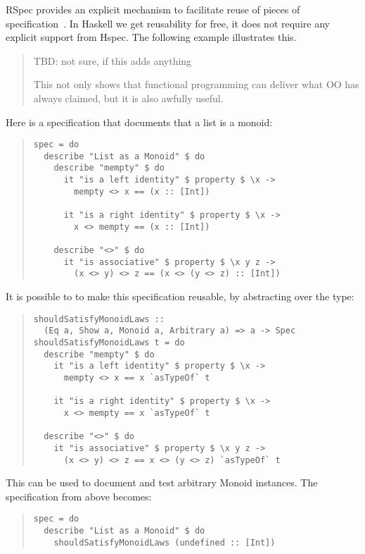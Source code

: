 \documentclass[preprint]{sigplanconf}
\begin{document}
RSpec provides an explicit mechanism to facilitate reuse of pieces of
specification~\cite{rspec}.
In Haskell we get reusability for free, it does not require any
explicit support from Hspec.
The following example illustrates this.

\begin{quote}
  TBD: not sure, if this adds anything

This not only shows that functional programming can deliver what OO
has always claimed, but it is also awfully useful.
\end{quote}
Here is a specification that documents that a list is a monoid:

\begin{quote}
\small
\begin{verbatim}
spec = do
  describe "List as a Monoid" $ do
    describe "mempty" $ do
      it "is a left identity" $ property $ \x ->
        mempty <> x == (x :: [Int])

      it "is a right identity" $ property $ \x ->
        x <> mempty == (x :: [Int])

    describe "<>" $ do
      it "is associative" $ property $ \x y z ->
        (x <> y) <> z == (x <> (y <> z) :: [Int])
\end{verbatim}
\end{quote}

\noindent It is possible to to make this specification reusable, by
abstracting over the type:

\begin{quote}
\small
\begin{verbatim}
shouldSatisfyMonoidLaws ::
  (Eq a, Show a, Monoid a, Arbitrary a) => a -> Spec
shouldSatisfyMonoidLaws t = do
  describe "mempty" $ do
    it "is a left identity" $ property $ \x ->
      mempty <> x == x `asTypeOf` t

    it "is a right identity" $ property $ \x ->
      x <> mempty == x `asTypeOf` t

  describe "<>" $ do
    it "is associative" $ property $ \x y z ->
      (x <> y) <> z == x <> (y <> z) `asTypeOf` t
\end{verbatim}
\end{quote}

\noindent This can be used to document and test arbitrary Monoid
instances.
The specification from above becomes:

\begin{quote}
\small
\begin{verbatim}
spec = do
  describe "List as a Monoid" $ do
    shouldSatisfyMonoidLaws (undefined :: [Int])
\end{verbatim}
\end{quote}
\end{document}
